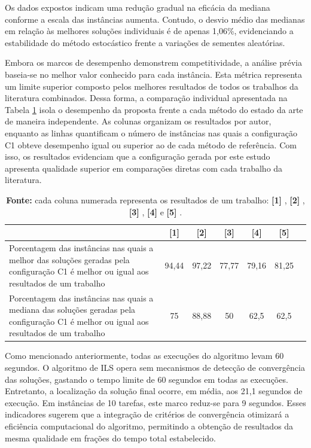 Os dados expostos indicam uma redução gradual na eficácia da mediana conforme a escala das instâncias aumenta. Contudo, o desvio médio das medianas em relação às melhores soluções individuais é de apenas 1,06\%, evidenciando a estabilidade do método estocástico frente a variações de sementes aleatórias.

Embora os marcos de desempenho demonstrem competitividade, a análise prévia baseia-se no melhor valor conhecido para cada instância. Esta métrica representa um limite superior composto pelos melhores resultados de todos os trabalhos da literatura combinados. Dessa forma, a comparação individual apresentada na Tabela \ref{tab:comparacao_estado} isola o desempenho da proposta frente a cada método do estado da arte de maneira independente. As colunas organizam os resultados por autor, enquanto as linhas quantificam o número de instâncias nas quais a configuração C1 obteve desempenho igual ou superior ao de cada método de referência. Com isso, os resultados evidenciam que a configuração gerada por este estudo apresenta qualidade superior em comparações diretas com cada trabalho da literatura.

\begin{table}[ht]
\centering
\caption{Comparação individual entre este trabalho e algoritmos da literatura.}
\label{tab:comparacao_estado}
\begin{tabularx}{\textwidth}{Xcccccc}
\hline
\textbf{}                 & \textbf{[1]}          & \textbf{[2]}            & \textbf{[3]}        & \textbf{[4] }      & \textbf{[5]}   \\ \hline
Porcentagem das instâncias nas quais a melhor das soluções geradas pela configuração C1 é melhor ou igual aos resultados de um trabalho & 94,44 & 97,22 & 77,77 & 79,16 & 81,25  \\ 
Porcentagem das instâncias nas quais a mediana das soluções geradas pela configuração C1 é melhor ou igual aos resultados de um trabalho & 75 & 88,88 & 50 & 62,5 & 62,5  \\ 
\hline
\end{tabularx}
\caption*{\small \textbf{Fonte:} cada coluna numerada representa os resultados de um trabalho: \textbf{[1]} \cite{dos2010combination}, \textbf{[2]} \cite{wang2014variable}, \textbf{[3]} \cite{ahmadian2021meta}, \textbf{[4]} \cite{abderrazzak2022adaptive} e \textbf{[5]} \cite{sabri2023reinforcement}.}
\end{table}

Como mencionado anteriormente, todas as execuções do algoritmo levam 60 segundos. O algoritmo de \ac{ILS} opera sem mecanismos de detecção de convergência das soluções, gastando o tempo limite de 60 segundos em todas as execuções. Entretanto, a localização da solução final ocorre, em média, aos 21,1 segundos de execução. Em instâncias de 10 tarefas, este marco reduz-se para 9 segundos. Esses indicadores sugerem que a integração de critérios de convergência otimizará a eficiência computacional do algoritmo, permitindo a obtenção de resultados da mesma qualidade em frações do tempo total estabelecido.

